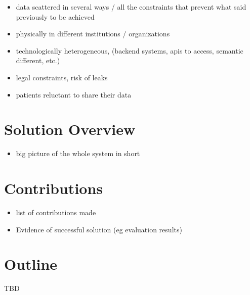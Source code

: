 


\begin{itemize}
    \item data scattered in several ways / all the constraints that prevent what said previously to be achieved
    \item physically in different institutions / organizations
    \item technologically heterogeneous, (backend systems, apis to access, semantic different, etc.)
    \item legal constraints, risk of leaks
    \item  patients reluctant to share their data
\end{itemize}


\section{Solution Overview}

\begin{itemize}
    \item big picture of the whole system in short
\end{itemize}


\section{Contributions}

\begin{itemize}
    \item list of contributions made
    \item Evidence of successful solution (eg evaluation results)
\end{itemize}


\section{Outline}
TBD
